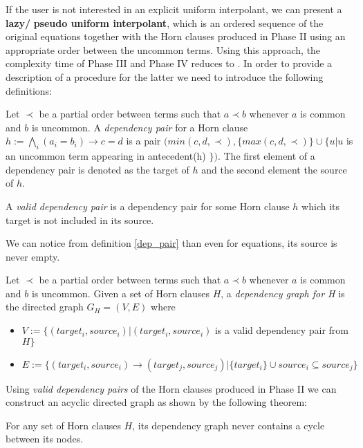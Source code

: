 If the user is not interested in an explicit uniform interpolant, 
we can present a \textbf{lazy/} 
\textbf{pseudo uniform interpolant}, which is an ordered 
sequence of the original equations 
together with the Horn clauses produced in Phase II 
using an appropriate order between the uncommon terms.
Using this approach, the complexity time of Phase III
and Phase IV reduces to .
In order to
provide a description of a procedure for the latter we need
to introduce the following definitions:

\begin{definition}\label{dep_pair}
  Let $\prec$ be a partial order between terms 
  such that $a \prec b$ whenever 
  $a$ is common and $b$ is uncommon. A \emph{dependency pair}
  for a Horn clause $h := \bigwedge_i (a_i = b_i) \rightarrow c = d$
  is a pair $(min(c, d, \prec), \{max(c, d, \prec)\} \cup \{ u | u$ 
  is an uncommon term appearing in antecedent(h) $\})$.
  The first element of a dependency pair is denoted as the
  target of $h$ and the second element the source of $h$.

  A \emph{valid dependency pair} is a dependency pair for some
  Horn clause $h$ which its target is not included in its
  source.
\end{definition}

We can notice from definition \ref{dep_pair} than even for 
equations, its source is never empty. 

\begin{definition}\label{dep_graph}
  Let $\prec$ be a partial order between terms 
  such that $a \prec b$ whenever 
  $a$ is common and $b$ is uncommon. Given a set of 
  Horn clauses $H$, a \emph{dependency graph for H}
  is the directed graph $G_H = (V, E)$ where
  \begin{itemize}
    \item $V := \{(target_i, source_i) | (target_i, source_i)$ 
      is a valid dependency pair from $H \}$
    \item $E := \{(target_i, source_i) \rightarrow (target_j, source_j) | 
        \{target_i\} \cup source_i \subseteq source_j
      \}$ 
  \end{itemize}
\end{definition}

Using \emph{valid dependency pairs} of the Horn clauses 
produced in Phase II
we can construct an acyclic directed graph as shown 
by the following theorem:

\begin{theorem}
  For any set of Horn clauses $H$, its dependency graph 
  never contains a cycle between its nodes.
\end{theorem}

